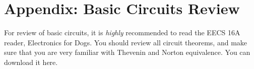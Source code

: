 \chapter{Appendix: Basic Circuits Review}
\label{app:circuits}
For review of basic circuits, it is \emph{highly} recommended to read the EECS 16A reader, Electronics for Dogs.  You should review all circuit theorems, and make sure that you are very familiar with Thevenin and Norton equivalence.  You can download it here.
